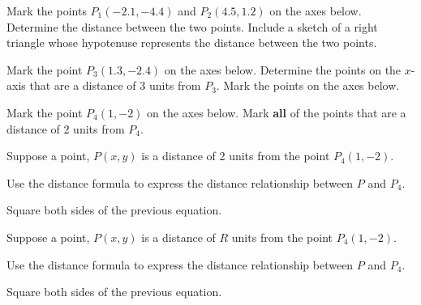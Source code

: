 \begin{problem}
\item Mark the points $P_1(-2.1,-4.4)$ and $P_2(4.5,1.2)$ on the axes
  below. Determine the distance between the two points.  Include a
  sketch of a right triangle whose hypotenuse represents the distance
  between the two points.

  \hspace*{-6em}
  \scalebox{0.95}{}

  \vfill

  \clearpage

\item Mark the point $P_3(1.3,-2.4)$ on the axes below. Determine the
  points on the $x$-axis that are a distance of 3 units from $P_3$.
   Mark the points on
  the axes below.

  \hspace*{-6em}
  \scalebox{0.95}{}

  \vfill


\clearpage

\item Mark the point $P_4(1,-2)$ on the axes below. Mark \textbf{all}
  of the points that are a distance of 2 units from $P_4$.

  \hspace*{-6em}
  \scalebox{0.95}{}

  \vfill


\clearpage

\item Suppose a point, $P(x,y)$ is a distance of 2 units from the
  point $P_4(1,-2)$.
  \begin{subproblem}
  \item Use the distance formula to express the distance relationship
    between $P$ and $P_4$.
    \vfill
  \item Square both sides of the previous equation.
    \vfill
  \end{subproblem}

\item Suppose a point, $P(x,y)$ is a distance of $R$ units from the
  point $P_4(1,-2)$.
  \begin{subproblem}
  \item Use the distance formula to express the distance relationship
    between $P$ and $P_4$.
    \vfill
  \item Square both sides of the previous equation.
    \vfill
  \end{subproblem}

\end{problem}


